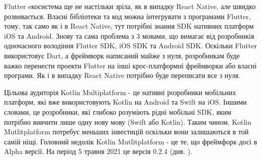 Flutter eкосистема ще не настільки зріла, як в випадку React Native, але швидко розвивається.
Власні бібліотеки та код можна інтегрувати з програмами Flutter, тому, так само як і в React Native,
тут потрібні знання SDK нативних платформ iOS та Android.
Знову та сама проблема з 3 мовами, що вимагає від розробників одночасного володіння Flutter SDK, iOS SDK та Android SDK.
Оскільки Flutter використовує Dart, а фреймворк написаний майже з нуля,
розробникам буде важко перенести проекти Flutter на інші крос-платформні фреймворки або власні програми.
Як і в випадку React Native потрібно буде переписати все з нуля.

Цільова аудиторія Kotlin Multiplatform - це нативні розробники мобільних платформ, які вже використовують Kotlin на Android та Swift на iOS.
Іншими словами, це розробники, які глибоко розуміють рідні мобільні SDK, яким потрібно вивчити лише одну нову мову (Swift або Kotlin).
Таким чином, Kotlin Mutlitplatform потребує меньших інвестицій оскільки вони залишаються в той самій ніщі.
Головний недолік Kotlin Mutlitplatform - це те, що фреймфорк досі в Alpha версії. На період 5 травня 2021 це версія 0.2.4 (див. \cite{kmm_plugin_releases}).

